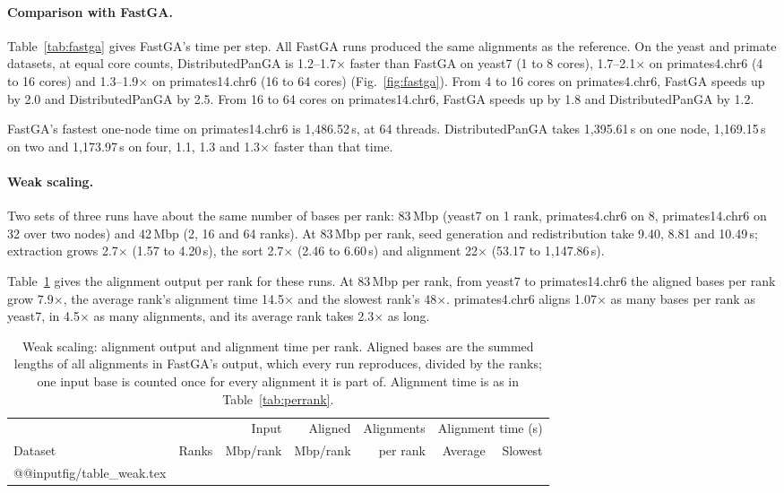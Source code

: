 \paragraph{Comparison with FastGA.} Table~\ref{tab:fastga} gives FastGA's time per step. All FastGA runs produced the same
alignments as the reference. On the yeast and primate datasets, at equal core counts, DistributedPanGA is
1.2--1.7$\times$ faster than FastGA on yeast7 (1 to 8 cores),
1.7--2.1$\times$ on primates4.chr6 (4 to 16 cores) and 1.3--1.9$\times$ on
primates14.chr6 (16 to 64 cores) (Fig.~\ref{fig:fastga}). From 4 to 16 cores
on primates4.chr6, FastGA speeds up by 2.0 and DistributedPanGA by 2.5. From
16 to 64 cores on primates14.chr6, FastGA speeds up by 1.8 and
DistributedPanGA by 1.2.

FastGA's fastest one-node time on primates14.chr6 is 1,486.52\,s, at 64
threads. DistributedPanGA takes 1,395.61\,s on one node, 1,169.15\,s on two
and 1,173.97\,s on four, 1.1, 1.3 and 1.3$\times$ faster than that time.

\paragraph{Weak scaling.} Two sets of three runs have about the same number
of bases per rank: 83\,Mbp (yeast7 on 1 rank, primates4.chr6 on 8,
primates14.chr6 on 32 over two nodes) and 42\,Mbp (2, 16 and 64 ranks).
At 83\,Mbp per rank, seed generation and redistribution take 9.40, 8.81 and
10.49\,s; extraction grows 2.7$\times$ (1.57 to 4.20\,s), the sort
2.7$\times$ (2.46 to 6.60\,s) and alignment 22$\times$ (53.17 to
1,147.86\,s).

Table~\ref{tab:weak} gives the alignment output per rank for these runs.
At 83\,Mbp per rank, from yeast7 to primates14.chr6 the aligned bases per
rank grow 7.9$\times$, the average rank's alignment time 14.5$\times$ and
the slowest rank's 48$\times$. primates4.chr6 aligns 1.07$\times$ as many
bases per rank as yeast7, in 4.5$\times$ as many alignments, and its
average rank takes 2.3$\times$ as long.

\begin{table}[htbp]
\caption{Weak scaling: alignment output and alignment time per rank. Aligned
bases are the summed lengths of all alignments in FastGA's output, which
every run reproduces, divided by the ranks; one input base is counted once
for every alignment it is part of. Alignment time is as in
Table~\ref{tab:perrank}.}\label{tab:weak}
\begin{tabular}{@{}lrrrrrr@{}}
\toprule
 & & Input & Aligned & Alignments & \multicolumn{2}{c}{Alignment time (s)} \\
\cmidrule{6-7}
Dataset & Ranks & Mbp/rank & Mbp/rank & per rank & Average & Slowest \\
\midrule
\csname @@input\endcsname fig/table_weak.tex
\botrule
\end{tabular}
\end{table}
